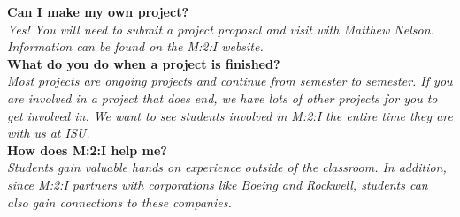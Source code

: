 \documentclass[10pt,foldmark,notumble]{leaflet}
\begin{document}
\textbf{Can I make my own project?}\ \\
\textit{Yes! You will need to submit a project proposal and visit with Matthew Nelson.  Information can be found on the M:2:I website.}\ \\
\textbf{What do you do when a project is finished?}\ \\
\textit{Most projects are ongoing projects and continue from semester to semester.  If you are involved in a project that does end, we have lots of other projects for you to get involved in.  We want to see students involved in M:2:I the entire time they are with us at ISU.}\ \\
\textbf{How does M:2:I help me?}\ \\
\textit{Students gain valuable hands on experience outside of the classroom.  In addition, since M:2:I partners with corporations like Boeing and Rockwell, students can also gain connections to these companies.}\ \\
\end{document}
